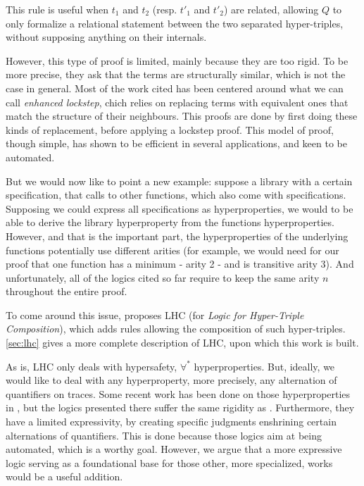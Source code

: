 \begin{prooftree}
\end{prooftree}

This rule is useful when $t_1$ and $t_2$ (resp. $t'_1$ and $t'_2$) are related, allowing $Q$ to only formalize a relational statement between the two separated hyper-triples, without supposing anything on their internals.

However, this type of proof is limited, mainly because they are too rigid. To be more precise, they ask that the terms are structurally similar, which is not the case in general. Most of the work cited has been centered around what we can call \emph{enhanced lockstep}, chich relies on replacing terms with equivalent ones that match the structure of their neighbours. This proofs are done by first doing these kinds of replacement, before applying a lockstep proof. This model of proof, though simple, has shown to be efficient in several applications, and keen to be automated.

But we would now like to point a new example: suppose a library with a certain specification, that calls to other functions, which also come with specifications. Supposing we could express all specifications as hyperproperties, we would to be able to derive the library hyperproperty from the functions hyperproperties. However, and that is the important part, the hyperproperties of the underlying functions potentially use different arities (for example, we would need for our proof that one function has a minimum - arity 2 - and is transitive arity 3). And unfortunately, all of the logics cited so far require to keep the same arity $n$ throughout the entire proof.

To come around this issue, \citet{DOsualdo22} proposes LHC (for \emph{Logic for Hyper-Triple Composition}), which adds rules allowing the composition of such hyper-triples. \cref{sec:lhc} gives a more complete description of LHC, upon which this work is built.

As is, LHC only deals with hypersafety, \ie $\forall^*$ hyperproperties. But, ideally, we would like to deal with any hyperproperty, more precisely, any alternation of quantifiers on traces. Some recent work has been done on those hyperproperties in \cite{Dickerson22, Dardinier23, Beutner22}, but the logics presented there suffer the same rigidity as \cite{Yang07, SousaD16, Benton04, BartheCK16}. Furthermore, they have a limited expressivity, by creating specific judgments enshrining certain alternations of quantifiers. This is done because those logics aim at being automated, which is a worthy goal. However, we argue that a more expressive logic serving as a foundational base for those other, more specialized, works would be a useful addition.

